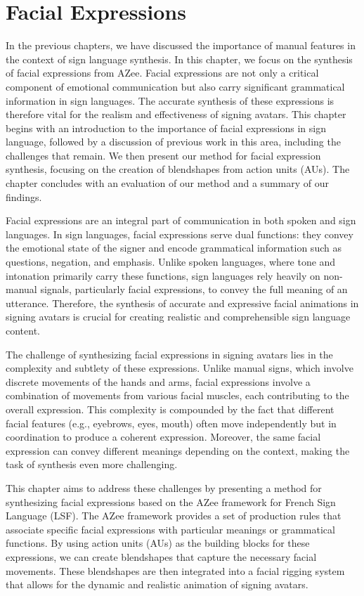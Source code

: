 \documentclass[../../main.tex]{subfiles}
\begin{document}
\chapter{Facial Expressions}
\label{ch:facial_expressions}

In the previous chapters, we have discussed the importance of manual features in the context of sign language synthesis. In this chapter, we focus on the synthesis of facial expressions from AZee. Facial expressions are not only a critical component of emotional communication but also carry significant grammatical information in sign languages. The accurate synthesis of these expressions is therefore vital for the realism and effectiveness of signing avatars. This chapter begins with an introduction to the importance of facial expressions in sign language, followed by a discussion of previous work in this area, including the challenges that remain. We then present our method for facial expression synthesis, focusing on the creation of blendshapes from action units (AUs). The chapter concludes with an evaluation of our method and a summary of our findings.

Facial expressions are an integral part of communication in both spoken and sign languages. In sign languages, facial expressions serve dual functions: they convey the emotional state of the signer and encode grammatical information such as questions, negation, and emphasis. Unlike spoken languages, where tone and intonation primarily carry these functions, sign languages rely heavily on non-manual signals, particularly facial expressions, to convey the full meaning of an utterance. Therefore, the synthesis of accurate and expressive facial animations in signing avatars is crucial for creating realistic and comprehensible sign language content.

The challenge of synthesizing facial expressions in signing avatars lies in the complexity and subtlety of these expressions. Unlike manual signs, which involve discrete movements of the hands and arms, facial expressions involve a combination of movements from various facial muscles, each contributing to the overall expression. This complexity is compounded by the fact that different facial features (e.g., eyebrows, eyes, mouth) often move independently but in coordination to produce a coherent expression. Moreover, the same facial expression can convey different meanings depending on the context, making the task of synthesis even more challenging.

This chapter aims to address these challenges by presenting a method for synthesizing facial expressions based on the AZee framework for French Sign Language (LSF). The AZee framework provides a set of production rules that associate specific facial expressions with particular meanings or grammatical functions. By using action units (AUs) as the building blocks for these expressions, we can create blendshapes that capture the necessary facial movements. These blendshapes are then integrated into a facial rigging system that allows for the dynamic and realistic animation of signing avatars.
\end{document}
